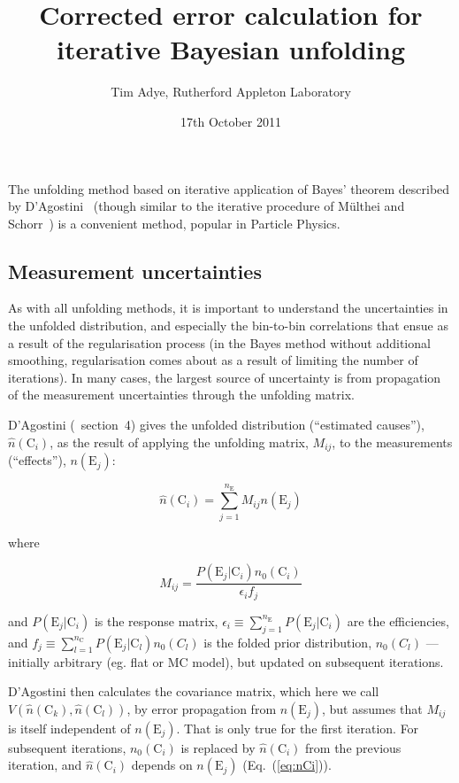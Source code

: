 \documentclass[12pt,a4paper]{article}
\newcommand{\E}{\mathrm{E}}
\newcommand{\C}{\mathrm{C}}
\begin{document}
\title{Corrected error calculation for iterative Bayesian unfolding}
\author{Tim Adye, Rutherford Appleton Laboratory}
\date{17th October 2011}
\maketitle

The unfolding method based on iterative application of Bayes' theorem
described by D'Agostini~\cite{D'Agostini:1994zf}
(though similar to the iterative procedure of
M\"ulthei and Schorr~\cite{Multhei:1986ps})
is a convenient method, popular in Particle Physics.

\subsection{Measurement uncertainties}

As with all unfolding methods, it is important to understand
the uncertainties in the unfolded distribution, and especially the bin-to-bin correlations
that ensue as a result of the regularisation process (in the Bayes method without additional smoothing, regularisation
comes about as a result of limiting the number of iterations).
In many cases, the largest source of uncertainty is from propagation of the measurement
uncertainties through the unfolding matrix.

D'Agostini (\cite{D'Agostini:1994zf}~section~4) gives the unfolded distribution (``estimated causes''), $\hat{n}(\C_i)$,
as the result of applying the unfolding matrix, $M_{ij}$, to the measurements (``effects''), $n(\E_j)$:

\begin{equation}
\hat{n}(\C_i) = \sum_{j=1}^{n_{\E}} M_{ij} n(\E_j)
\label{eq:nCi}
\end{equation}

\noindent where

\begin{equation}
M_{ij} = \frac{P(\E_j|\C_i) n_0(\C_i)}{\epsilon_i f_j}
\end{equation}

\noindent and
$P(\E_j|\C_i)$ is the response matrix,
$\epsilon_i \equiv \sum_{j=1}^{n_{\E}} P(\E_j|\C_i)$ are the efficiencies, and
$f_j \equiv \sum_{l=1}^{n_{\C}} P(\E_j|\C_l) n_0(C_l)$ is the folded
prior distribution, $n_0(C_l)$ --- initially arbitrary (eg. flat or MC model), but updated on
subsequent iterations.

D'Agostini then calculates the covariance matrix, which here we call $V(\hat{n}(\C_k),\hat{n}(\C_l))$,
by error propagation from $n(\E_j)$,
but assumes that $M_{ij}$ is itself independent of $n(\E_j)$. That is only true for the first iteration.
For subsequent iterations, $n_0(\C_i)$ is replaced by $\hat{n}(\C_i)$ from the
previous iteration, and $\hat{n}(\C_i)$ depends on $n(\E_j)$ (Eq.~(\ref{eq:nCi})).
\end{document}
